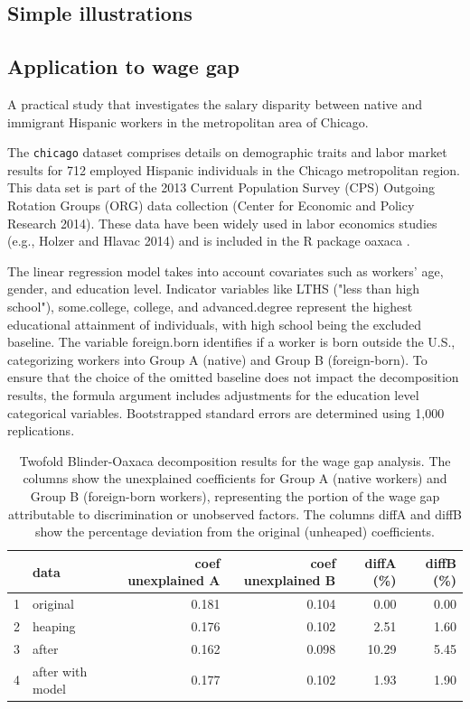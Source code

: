 \documentclass[pdflatex,sn-mathphys-num]{sn-jnl}%
\theoremstyle{thmstyleone}%
\theoremstyle{thmstyletwo}%
\theoremstyle{thmstylethree}%
\begin{document}
\subsection{Simple illustrations}

\subsection{Application to wage gap}\label{sec:wagegap}

A practical study that investigates the salary disparity between native and immigrant Hispanic workers in the metropolitan area of Chicago.

The \texttt{chicago} dataset comprises details on demographic traits and labor market results for 712 employed Hispanic individuals in the Chicago metropolitan region. This data set is part of the 2013 Current Population Survey (CPS) Outgoing Rotation Groups (ORG) data collection (Center for Economic and Policy Research 2014). These data have been widely used in labor economics studies (e.g., Holzer and Hlavac 2014) and is included in the R package oaxaca \citep{oaxaca}.


The linear regression model takes into account covariates such as workers' age, gender, and education level. Indicator variables like LTHS ("less than high school"), some.college, college, and advanced.degree represent the highest educational attainment of individuals, with high school being the excluded baseline. The variable foreign.born identifies if a worker is born outside the U.S., categorizing workers into Group A (native) and Group B (foreign-born). To ensure that the choice of the omitted baseline does not impact the decomposition results, the formula argument includes adjustments for the education level categorical variables. Bootstrapped standard errors are determined using 1,000 replications.

\begin{table}[ht]
\centering
\begin{tabular}{rlrrrr}
  \hline
 & data & coef unexplained A & coef unexplained B & diffA (\%) & diffB (\%) \\
  \hline
1 & original & 0.181 & 0.104 & 0.00 & 0.00 \\
  2 & heaping & 0.176 & 0.102 & 2.51 & 1.60 \\
  3 & after & 0.162 & 0.098 & 10.29 & 5.45 \\
  4 & after with model & 0.177 & 0.102 & 1.93 & 1.90 \\
   \hline
\end{tabular}
\caption{Twofold Blinder-Oaxaca decomposition results for the wage gap analysis. The columns show the unexplained coefficients for Group A (native workers) and Group B (foreign-born workers), representing the portion of the wage gap attributable to discrimination or unobserved factors. The columns diffA and diffB show the percentage deviation from the original (unheaped) coefficients.}
\label{tab:twofold}
\end{table}
\end{document}
